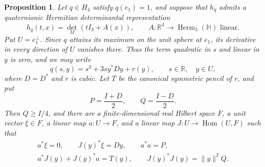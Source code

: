 \documentclass[10pt,a4paper]{amsart}
\newtheorem{proposition}{Proposition}
\begin{document}
\begin{proposition}
\label{prop:contact-data}
Let $q\in H_4$ satisfy $q(e_1)=1$, and suppose that $h_q$ admits a
quaternionic Hermitian determinantal representation
\[
 h_q(t,x)=\det_M(tI_3+A(x)),\qquad
 A\colon\mathbb R^4\to\operatorname{Herm}_3(\mathbb H)
 \text{ linear}.
\]
Put $U=e_1^\perp$.  Since $q$ attains its maximum on the unit sphere
at $e_1$, its derivative in every direction of $U$ vanishes there.
Thus the term quadratic in $s$ and linear in $y$ is zero, and we may write
\[
 q(s,y)=s^3+3sy^*Dy+r(y),
 \qquad s\in\mathbb R,\quad y\in U,
\]
where $D=D^*$ and $r$ is cubic.  Let $T$ be the canonical symmetric
pencil of $r$, and put
\[
 P=\frac{I+D}{2},\qquad Q=\frac{I-D}{2}.
\]
Then $Q\geqslant I/4$, and there are a finite-dimensional real Hilbert
space $F$, a unit vector $\xi\in F$, a linear map $a\colon U\to F$, and
a linear map $J\colon U\to\operatorname{Hom}(U,F)$ such that
\[
 \begin{gathered}
 a^*\xi=0,\qquad J(y)^*\xi=Dy,\qquad a^*a=P,\\
 a^*J(y)+J(y)^*a=T(y),\qquad
 J(y)^*J(y)=\|y\|^2Q.
 \end{gathered}
\]
\end{proposition}
\end{document}
